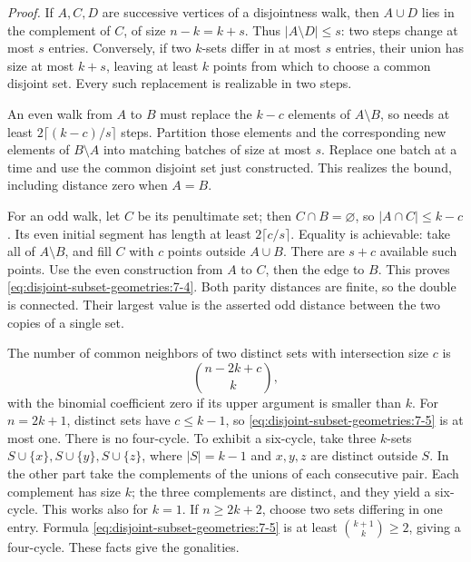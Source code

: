 \emph{Proof.} If \(A,C,D\) are successive vertices of a disjointness walk, then \(A\cup D\) lies in the complement of \(C\), of size \(n-k=k+s\). Thus \(|A\setminus D|\leq s\): two steps change at most \(s\) entries. Conversely, if two \(k\)-sets differ in at most \(s\) entries, their union has size at most \(k+s\), leaving at least \(k\) points from which to choose a common disjoint set. Every such replacement is realizable in two steps.

An even walk from \(A\) to \(B\) must replace the \(k-c\) elements of \(A\setminus B\), so needs at least \(2\lceil(k-c)/s\rceil\) steps. Partition those elements and the corresponding new elements of \(B\setminus A\) into matching batches of size at most \(s\). Replace one batch at a time and use the common disjoint set just constructed. This realizes the bound, including distance zero when \(A=B\).

For an odd walk, let \(C\) be its penultimate set; then \(C\cap B=\varnothing\), so \(|A\cap C|\leq k-c\). Its even initial segment has length at least \(2\lceil c/s\rceil\). Equality is achievable: take all of \(A\setminus B\), and fill \(C\) with \(c\) points outside \(A\cup B\). There are \(s+c\) available such points. Use the even construction from \(A\) to \(C\), then the edge to \(B\). This proves \eqref{eq:disjoint-subset-geometries:7-4}. Both parity distances are finite, so the double is connected. Their largest value is the asserted odd distance between the two copies of a single set.

The number of common neighbors of two distinct sets with intersection size \(c\) is \begin{equation}
\binom{n-2k+c}{k},
\label{eq:disjoint-subset-geometries:7-5}
\end{equation} with the binomial coefficient zero if its upper argument is smaller than \(k\). For \(n=2k+1\), distinct sets have \(c\leq k-1\), so \eqref{eq:disjoint-subset-geometries:7-5} is at most one. There is no four-cycle. To exhibit a six-cycle, take three \(k\)-sets \(S\cup\{x\},S\cup\{y\},S\cup\{z\}\), where \(|S|=k-1\) and \(x,y,z\) are distinct outside \(S\). In the other part take the complements of the unions of each consecutive pair. Each complement has size \(k\); the three complements are distinct, and they yield a six-cycle. This works also for \(k=1\). If \(n\geq2k+2\), choose two sets differing in one entry. Formula \eqref{eq:disjoint-subset-geometries:7-5} is at least \(\binom{k+1}k\geq2\), giving a four-cycle. These facts give the gonalities.


